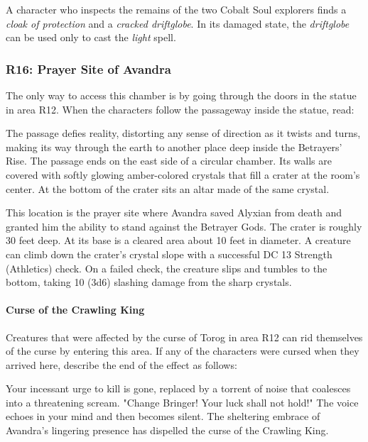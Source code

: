 \documentclass[a4paper, 11pt, bg=full, twocolumn, nooutline]{dndbook}
\begin{document}
A character who inspects the remains of the two Cobalt Soul explorers finds a \textit{cloak of protection} and a \textit{cracked driftglobe}. In its damaged state, the \textit{driftglobe} can be used only to cast the \textit{light} spell.

\subsubsection{R16: Prayer Site of Avandra}

The only way to access this chamber is by going through the doors in the statue in area R12. When the characters follow the passageway inside the statue, read:

\begin{DndReadAloud}
The passage defies reality, distorting any sense of direction as it twists and turns, making its way through the earth to another place deep inside the Betrayers' Rise. The passage ends on the east side of a circular chamber. Its walls are covered with softly glowing amber-colored crystals that fill a crater at the room's center. At the bottom of the crater sits an altar made of the same crystal.
\end{DndReadAloud}


This location is the prayer site where Avandra saved Alyxian from death and granted him the ability to stand against the Betrayer Gods. The crater is roughly 30 feet deep. At its base is a cleared area about 10 feet in diameter. A creature can climb down the crater's crystal slope with a successful DC 13 Strength (Athletics) check. On a failed check, the creature slips and tumbles to the bottom, taking 10 (3d6) slashing damage from the sharp crystals.

\paragraph{Curse of the Crawling King}

Creatures that were affected by the curse of Torog in area R12 can rid themselves of the curse by entering this area. If any of the characters were cursed when they arrived here, describe the end of the effect as follows:

\begin{DndReadAloud}
Your incessant urge to kill is gone, replaced by a torrent of noise that coalesces into a threatening scream.
"Change Bringer! Your luck shall not hold!"
The voice echoes in your mind and then becomes silent. The sheltering embrace of Avandra's lingering presence has dispelled the curse of the Crawling King.
\end{DndReadAloud}
\end{document}
